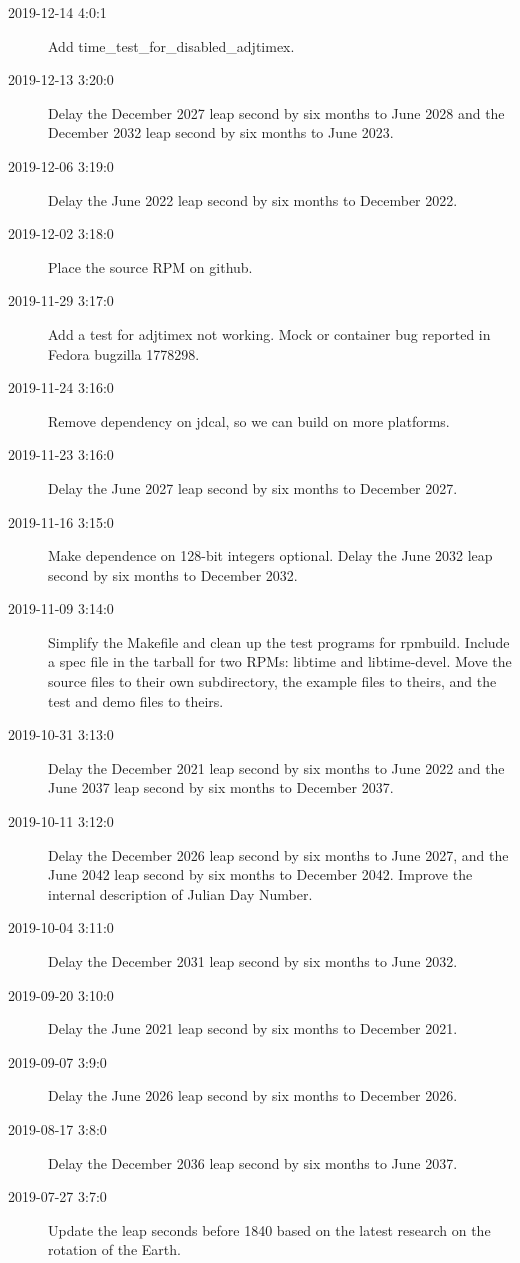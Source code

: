 \documentclass[letterpaper,twoside]{article}
\begin{document}
\begin{description}
  \item[2019-12-14 4:0:1]Add {\ttfamily time\_test\_for\_disabled\_adjtimex}.
\item[2019-12-13 3:20:0]Delay the December 2027 leap second by six months
  to June 2028 and the December 2032 leap second by six months to June 2023.
\item[2019-12-06 3:19:0]Delay the June 2022 leap second by six months
  to December 2022.
\item[2019-12-02 3:18:0]Place the source RPM on github.
\item[2019-11-29 3:17:0]Add a test for adjtimex not working.
  Mock or container bug reported in Fedora bugzilla 1778298.
\item[2019-11-24 3:16:0]Remove dependency on jdcal, so we can build
  on more platforms.
\item[2019-11-23 3:16:0]Delay the June 2027 leap second by six months
  to December 2027.
\item[2019-11-16 3:15:0]Make dependence on 128-bit integers optional.
  Delay the June 2032 leap second by six months to December 2032.
\item[2019-11-09 3:14:0]Simplify the Makefile and clean up the
  test programs for rpmbuild.  Include a spec file in the tarball
  for two RPMs: libtime and libtime-devel.  Move the source
  files to their own subdirectory, the example files to theirs,
  and the test and demo files to theirs.
\item[2019-10-31 3:13:0]Delay the December 2021 leap second by
  six months to June 2022 and the June 2037 leap second by six
  months to December 2037.
\item[2019-10-11 3:12:0]Delay the December 2026 leap second by
  six months to June 2027, and the June 2042 leap second by six
  months to December 2042.  Improve the internal description of
  Julian Day Number.
\item[2019-10-04 3:11:0]Delay the December 2031 leap second by
  six months to June 2032.
\item[2019-09-20 3:10:0]Delay the June 2021 leap second by six
  months to December 2021.
\item[2019-09-07 3:9:0]Delay the June 2026 leap second by six months
  to December 2026.
\item[2019-08-17 3:8:0]Delay the December 2036 leap second by six
  months to June 2037.
\item[2019-07-27 3:7:0]Update the leap seconds before 1840 based
  on the latest research on the rotation of the Earth.

\end{description}
\end{document}
